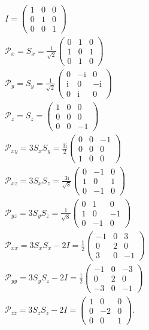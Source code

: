 \documentclass[twocolumn,twoside,showpacs,preprintnumbers,superscriptaddress,amsmath,amssymb,prc]{revtex4}
\begin{document}
\begin{align}
& I=\left(\begin{array}{lll}
1 & 0 & 0 \\
0 & 1 & 0 \\
0 & 0 & 1
\end{array}\right) \\
& \mathscr{P}_x=S_x=\frac{1}{\sqrt{2}}\left(\begin{array}{lll}
0 & 1 & 0 \\
1 & 0 & 1 \\
0 & 1 & 0
\end{array}\right) \\
& \mathscr{P}_y=S_y=\frac{1}{\sqrt{2}}\left(\begin{array}{ccc}
0 & -\mathrm{i} & 0 \\
\mathrm{i} & 0 & -\mathrm{i} \\
0 & \mathrm{i} & 0
\end{array}\right) \\
& \mathscr{P}_z=S_z=\left(\begin{array}{ccc}
1 & 0 & 0 \\
0 & 0 & 0 \\
0 & 0 & -1
\end{array}\right) \\
& \mathscr{P}_{x y}=3 S_x S_y=\frac{3 \mathrm{i}}{2}\left(\begin{array}{ccc}
0 & 0 & -1 \\
0 & 0 & 0 \\
1 & 0 & 0
\end{array}\right) \\
& \mathscr{P}_{x z}=3 S_x S_z=\frac{3 \mathrm{i}}{\sqrt{8}}\left(\begin{array}{ccc}
0 & -1 & 0 \\
1 & 0 & 1 \\
0 & -1 & 0
\end{array}\right) \\
& \mathscr{P}_{y z}=3 S_y S_z=\frac{1}{\sqrt{8}}\left(\begin{array}{ccc}
0 & 1 & 0 \\
1 & 0 & -1 \\
0 & -1 & 0
\end{array}\right) \\
& \mathscr{P}_{x x}=3 S_x S_x-2 I=\frac{1}{2}\left(\begin{array}{ccc}
-1 & 0 & 3 \\
0 & 2 & 0 \\
3 & 0 & -1
\end{array}\right) \\
& \mathscr{P}_{y y}=3 S_y S_z-2 I=\frac{1}{2}\left(\begin{array}{ccc}
-1 & 0 & -3 \\
0 & 2 & 0 \\
-3 & 0 & -1
\end{array}\right) \\
& \mathscr{P}_{z z}=3 S_z S_z-2 I=\left(\begin{array}{ccc}
1 & 0 & 0 \\
0 & -2 & 0 \\
0 & 0 & 1
\end{array}\right) .
\label{rectangular_operator}
\end{align}
\end{document}

